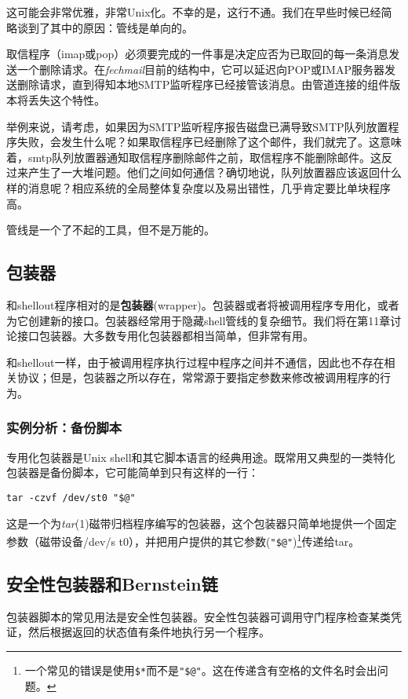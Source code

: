 \documentclass[12pt,oneside]{ctexbook}
\begin{document}
\begin{common-format}
这可能会非常优雅，非常Unix化。不幸的是，这行不通。我们在早些时候已经简略谈到了其中的原因：管线是单向的。

取信程序（imap或pop）必须要完成的一件事是决定应否为已取回的每一条消息发送一个删除请求。在\textit{fechmail}目前的结构中，它可以延迟向POP或IMAP服务器发送删除请求，直到得知本地SMTP监听程序已经接管该消息。由管道连接的组件版本将丢失这个特性。

举例来说，请考虑，如果因为SMTP监听程序报告磁盘已满导致SMTP队列放置程序失败，会发生什么呢？如果取信程序已经删除了这个邮件，我们就完了。这意味着，smtp队列放置器通知取信程序删除邮件之前，取信程序不能删除邮件。这反过来产生了一大堆问题。他们之间如何通信？确切地说，队列放置器应该返回什么样的消息呢？相应系统的全局整体复杂度以及易出错性，几乎肯定要比单块程序高。

管线是一个了不起的工具，但不是万能的。


\subsection{包装器}
和shellout程序相对的是\textbf{包装器}(wrapper)。包装器或者将被调用程序专用化，或者为它创建新的接口。包装器经常用于隐藏shell管线的复杂细节。我们将在第11章讨论接口包装器。大多数专用化包装器都相当简单，但非常有用。

和shellout一样，由于被调用程序执行过程中程序之间并不通信，因此也不存在相关协议；但是，包装器之所以存在，常常源于要指定参数来修改被调用程序的行为。


\subsubsection{实例分析：备份脚本}
专用化包装器是Unix shell和其它脚本语言的经典用途。既常用又典型的一类特化包装器是备份脚本，它可能简单到只有这样的一行：
\begin{Verbatim}
tar -czvf /dev/st0 "$@"
\end{Verbatim}

这是一个为\textit{tar}(1)磁带归档程序编写的包装器，这个包装器只简单地提供一个固定参数（磁带设备/dev/s t0），并把用户提供的其它参数(\verb+"$@"+)\footnote{一个常见的错误是使用\verb+$*+而不是\verb+"$@"+。这在传递含有空格的文件名时会出问题。}传递给tar。


\subsection{安全性包装器和Bernstein链}
包装器脚本的常见用法是安全性包装器。安全性包装器可调用守门程序检查某类凭证，然后根据返回的状态值有条件地执行另一个程序。


\end{common-format}
\end{document}
